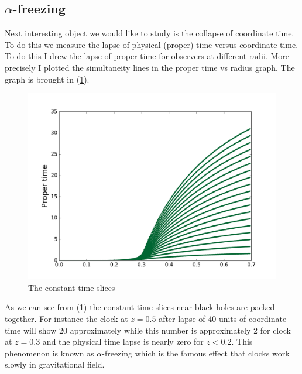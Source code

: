 \documentclass[a4paper,11pt]{article}
\begin{document}
\subsection{$\alpha$-freezing}
Next interesting object we would like to study is the collapse of coordinate time. To do this we measure the lapse of physical (proper) time versus coordinate time. To do this I drew the lapse of proper time for observers at different radii. More precisely I plotted the simultaneity lines in the  proper time vs radius graph. The graph is brought in (\ref{fig4}).
\begin{figure}[H]
	\centering
	\includegraphics[width=\textwidth]{time}
	\caption{The constant time slices\label{fig4}}
\end{figure}
As we can see from (\ref{fig4}) the constant time slices near black holes are packed together. For instance the clock at $z=0.5$ after lapse of 40 units of coordinate time will show $20$ approximately while this number is approximately $2$ for clock at $z=0.3$ and the physical time lapse is nearly zero for $z<0.2$. This phenomenon is known as $\alpha$-freezing  which is the famous effect that clocks work slowly in gravitational field.
\end{document}
